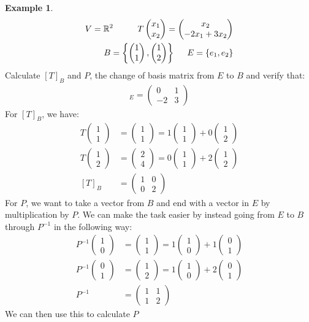 \documentclass{report}
\theoremstyle{remark}
\theoremstyle{definition}
\theoremstyle{definition}
\newtheorem{example}[theorem]{Example}
\theoremstyle{theorem}
\providecommand{\vectii}[2]{\begin{pmatrix}#1\\#2\end{pmatrix}}
\begin{document}
\begin{example}
    \begin{align*}
        V=\mathbb{R}^2 \hspace{10mm} 
        T\vectii{x_1}{x_2}= \begin{pmatrix}
        x_2\\ -2x_1+3x_2
        \end{pmatrix}
        \\
        B=\left\{\begin{pmatrix}
        1\\1
        \end{pmatrix},\begin{pmatrix}
        1\\2
        \end{pmatrix}\right\}
        \hspace{5mm}
        E=\left\{e_1,e_2\right\}
    \end{align*}
Calculate $[T]_B$ and $P$, the change of basis matrix from $E$ to $B$ and verify that:
\begin{align*}
    [T]_E = \begin{pmatrix}
    0&1\\
    -2&3
    \end{pmatrix}
\end{align*}
For $[T]_B$, we have:
\begin{align*}
    T\vectii{1}{1}&=\vectii{1}{1}=1\vectii{1}{1}+0\vectii{1}{2}
    \\
    T\vectii{1}{2}&=\vectii{2}{4}=0\vectii{1}{1}+2\vectii{1}{2}
    \\
    [T]_B&=\begin{pmatrix}
    1&0\\0&2
    \end{pmatrix}
\end{align*}
For $P$, we want to take a vector from $B$ and end with a vector in $E$ by multiplication by $P$. We can make the task easier by instead going from $E$ to $B$ through $P^{-1}$ in the following way:
\begin{align*}
    P^{-1}\vectii{1}{0}&=\vectii{1}{1}=1\vectii{1}{0}+1\vectii{0}{1}
    \\
    P^{-1}\vectii{0}{1}&=\vectii{1}{2}=1\vectii{1}{0}+2\vectii{0}{1}
    \\
    P^{-1}&=\begin{pmatrix}
    1&1\\1&2
    \end{pmatrix}
\end{align*}
We can then use this to calculate $P$
\end{example}
\end{document}
